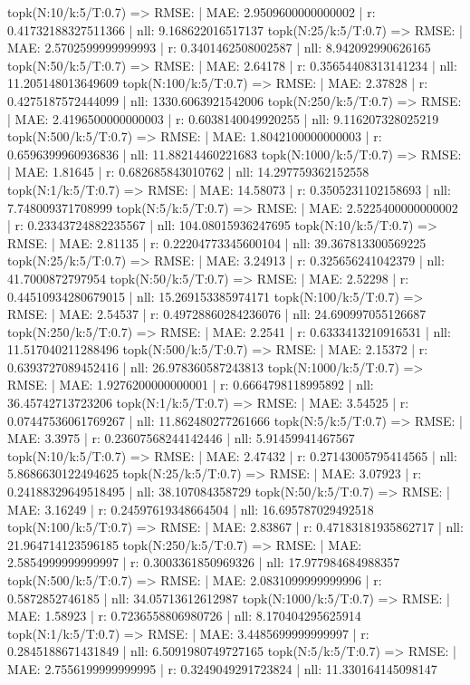 topk(N:10/k:5/T:0.7) => RMSE: | MAE: 2.9509600000000002 | r: 0.41732188327511366 | nll: 9.168622016517137
topk(N:25/k:5/T:0.7) => RMSE: | MAE: 2.5702599999999993 | r: 0.3401462508002587 | nll: 8.942092990626165
topk(N:50/k:5/T:0.7) => RMSE: | MAE: 2.64178 | r: 0.35654408313141234 | nll: 11.205148013649609
topk(N:100/k:5/T:0.7) => RMSE: | MAE: 2.37828 | r: 0.4275187572444099 | nll: 1330.6063921542006
topk(N:250/k:5/T:0.7) => RMSE: | MAE: 2.4196500000000003 | r: 0.6038140049920255 | nll: 9.116207328025219
topk(N:500/k:5/T:0.7) => RMSE: | MAE: 1.8042100000000003 | r: 0.6596399960936836 | nll: 11.88214460221683
topk(N:1000/k:5/T:0.7) => RMSE: | MAE: 1.81645 | r: 0.682685843010762 | nll: 14.297759362152558
topk(N:1/k:5/T:0.7) => RMSE: | MAE: 14.58073 | r: 0.3505231102158693 | nll: 7.748009371708999
topk(N:5/k:5/T:0.7) => RMSE: | MAE: 2.5225400000000002 | r: 0.23343724882235567 | nll: 104.08015936247695
topk(N:10/k:5/T:0.7) => RMSE: | MAE: 2.81135 | r: 0.22204773345600104 | nll: 39.367813300569225
topk(N:25/k:5/T:0.7) => RMSE: | MAE: 3.24913 | r: 0.325656241042379 | nll: 41.7000872797954
topk(N:50/k:5/T:0.7) => RMSE: | MAE: 2.52298 | r: 0.44510934280679015 | nll: 15.269153385974171
topk(N:100/k:5/T:0.7) => RMSE: | MAE: 2.54537 | r: 0.49728860284236076 | nll: 24.690997055126687
topk(N:250/k:5/T:0.7) => RMSE: | MAE: 2.2541 | r: 0.6333413210916531 | nll: 11.517040211288496
topk(N:500/k:5/T:0.7) => RMSE: | MAE: 2.15372 | r: 0.6393727089452416 | nll: 26.978360587243813
topk(N:1000/k:5/T:0.7) => RMSE: | MAE: 1.9276200000000001 | r: 0.6664798118995892 | nll: 36.45742713723206
topk(N:1/k:5/T:0.7) => RMSE: | MAE: 3.54525 | r: 0.07447536061769267 | nll: 11.862480277261666
topk(N:5/k:5/T:0.7) => RMSE: | MAE: 3.3975 | r: 0.23607568244142446 | nll: 5.91459941467567
topk(N:10/k:5/T:0.7) => RMSE: | MAE: 2.47432 | r: 0.27143005795414565 | nll: 5.8686630122494625
topk(N:25/k:5/T:0.7) => RMSE: | MAE: 3.07923 | r: 0.24188329649518495 | nll: 38.107084358729
topk(N:50/k:5/T:0.7) => RMSE: | MAE: 3.16249 | r: 0.24597619348664504 | nll: 16.695787029492518
topk(N:100/k:5/T:0.7) => RMSE: | MAE: 2.83867 | r: 0.47183181935862717 | nll: 21.964714123596185
topk(N:250/k:5/T:0.7) => RMSE: | MAE: 2.5854999999999997 | r: 0.3003361850969326 | nll: 17.977984684988357
topk(N:500/k:5/T:0.7) => RMSE: | MAE: 2.0831099999999996 | r: 0.5872852746185 | nll: 34.05713612612987
topk(N:1000/k:5/T:0.7) => RMSE: | MAE: 1.58923 | r: 0.7236558806980726 | nll: 8.170404295625914
topk(N:1/k:5/T:0.7) => RMSE: | MAE: 3.4485699999999997 | r: 0.2845188671431849 | nll: 6.5091980749727165
topk(N:5/k:5/T:0.7) => RMSE: | MAE: 2.7556199999999995 | r: 0.3249049291723824 | nll: 11.330164145098147
